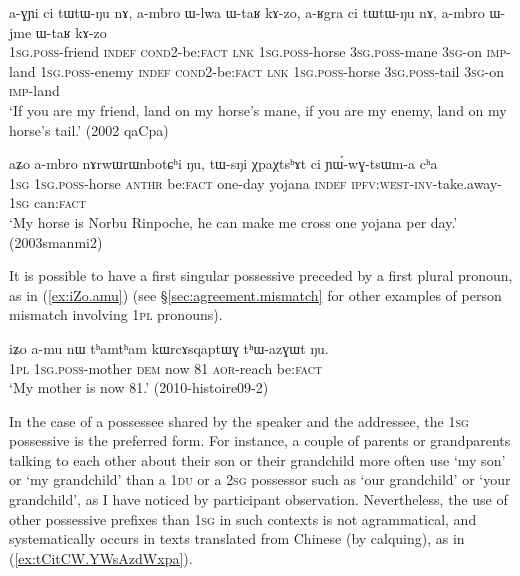  \begin{exe}
\ex \label{ex:ambro} 
\gll a-ɣɲi ci tɯ\redp{}tɯ-ŋu nɤ, a-mbro ɯ-lwa ɯ-taʁ kɤ-zo, a-ʁgra ci tɯ\redp{}tɯ-ŋu nɤ, a-mbro ɯ-jme ɯ-taʁ kɤ-zo \\
\textsc{1sg}.\textsc{poss}-friend \textsc{indef} \textsc{cond}\redp{}2-be:\textsc{fact} \textsc{lnk} \textsc{1sg}.\textsc{poss}-horse \textsc{3sg}.\textsc{poss}-mane \textsc{3sg}-on \textsc{imp}-land \textsc{1sg}.\textsc{poss}-enemy \textsc{indef} \textsc{cond}\redp{}2-be:\textsc{fact} \textsc{lnk} \textsc{1sg}.\textsc{poss}-horse \textsc{3sg}.\textsc{poss}-tail \textsc{3sg}-on \textsc{imp}-land  \\
\glt `If you are my friend, land on my horse's mane, if you are my enemy, land on my horse's tail.' (2002 qaCpa)
\end{exe}

\begin{exe}
\ex \label{ex:aZo.ambro}
\gll aʑo a-mbro nɤrwɯrɯnbotɕʰi ŋu, tɯ-sŋi χpaχtsʰɤt ci ɲɯ́-wɣ-tsɯm-a cʰa \\
\textsc{1sg} \textsc{1sg}.\textsc{poss}-horse \textsc{anthr} be:\textsc{fact} one-day yojana \textsc{indef} \textsc{ipfv}:\textsc{west}-\textsc{inv}-take.away-\textsc{1sg} can:\textsc{fact} \\
\glt `My horse is Norbu Rinpoche, he can make me cross one yojana per day.' (2003smanmi2)
\end{exe}

It is possible to have a first singular possessive preceded by a first plural pronoun, as in (\ref{ex:iZo.amu}) (see §\ref{sec:agreement.mismatch} for other examples of person mismatch involving \textsc{1pl} pronouns).

\begin{exe}
\ex \label{ex:iZo.amu}
\gll iʑo a-mu nɯ tʰamtʰam kɯrcɤsqaptɯɣ tʰɯ-azɣɯt ŋu. \\
\textsc{1pl} \textsc{1sg}.\textsc{poss}-mother \textsc{dem} now 81 \textsc{aor}-reach be:\textsc{fact} \\
\glt `My mother is now 81.' (2010-histoire09-2)
\end{exe}

In the case of a possessee shared by the speaker and the addressee, the \textsc{1sg} possessive is the preferred form. For instance, a couple of parents or grandparents talking to each other about their son or their grandchild more often use  `my son' or  `my grandchild' than a \textsc{1du} or a \textsc{2sg} possessor such as  `our grandchild' or  `your grandchild', as I have noticed by participant observation. Nevertheless, the use of other possessive prefixes than \textsc{1sg} in such contexts is not agrammatical, and systematically occurs in texts translated from Chinese (by calquing), as in (\ref{ex:tCitCW.YWsAzdWxpa}). 

